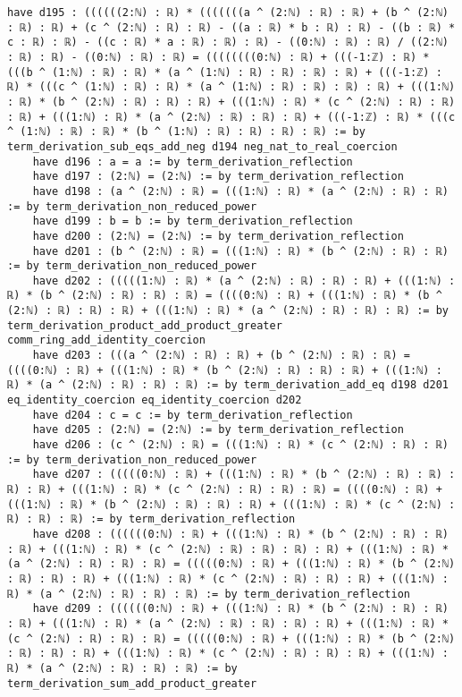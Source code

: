 \documentclass{article}
\begin{document}
\begin{tcolorbox}[colback=white!10, width=\linewidth]
\begin{lstlisting}[language=Lean4]
    have d195 : ((((((2:ℕ) : ℝ) * (((((((a ^ (2:ℕ) : ℝ) : ℝ) + (b ^ (2:ℕ) : ℝ) : ℝ) + (c ^ (2:ℕ) : ℝ) : ℝ) - ((a : ℝ) * b : ℝ) : ℝ) - ((b : ℝ) * c : ℝ) : ℝ) - ((c : ℝ) * a : ℝ) : ℝ) : ℝ) - ((0:ℕ) : ℝ) : ℝ) / ((2:ℕ) : ℝ) : ℝ) - ((0:ℕ) : ℝ) : ℝ) = ((((((((0:ℕ) : ℝ) + (((-1:ℤ) : ℝ) * (((b ^ (1:ℕ) : ℝ) : ℝ) * (a ^ (1:ℕ) : ℝ) : ℝ) : ℝ) : ℝ) + (((-1:ℤ) : ℝ) * (((c ^ (1:ℕ) : ℝ) : ℝ) * (a ^ (1:ℕ) : ℝ) : ℝ) : ℝ) : ℝ) + (((1:ℕ) : ℝ) * (b ^ (2:ℕ) : ℝ) : ℝ) : ℝ) + (((1:ℕ) : ℝ) * (c ^ (2:ℕ) : ℝ) : ℝ) : ℝ) + (((1:ℕ) : ℝ) * (a ^ (2:ℕ) : ℝ) : ℝ) : ℝ) + (((-1:ℤ) : ℝ) * (((c ^ (1:ℕ) : ℝ) : ℝ) * (b ^ (1:ℕ) : ℝ) : ℝ) : ℝ) : ℝ) := by term_derivation_sub_eqs_add_neg d194 neg_nat_to_real_coercion
    have d196 : a = a := by term_derivation_reflection
    have d197 : (2:ℕ) = (2:ℕ) := by term_derivation_reflection
    have d198 : (a ^ (2:ℕ) : ℝ) = (((1:ℕ) : ℝ) * (a ^ (2:ℕ) : ℝ) : ℝ) := by term_derivation_non_reduced_power
    have d199 : b = b := by term_derivation_reflection
    have d200 : (2:ℕ) = (2:ℕ) := by term_derivation_reflection
    have d201 : (b ^ (2:ℕ) : ℝ) = (((1:ℕ) : ℝ) * (b ^ (2:ℕ) : ℝ) : ℝ) := by term_derivation_non_reduced_power
    have d202 : (((((1:ℕ) : ℝ) * (a ^ (2:ℕ) : ℝ) : ℝ) : ℝ) + (((1:ℕ) : ℝ) * (b ^ (2:ℕ) : ℝ) : ℝ) : ℝ) = ((((0:ℕ) : ℝ) + (((1:ℕ) : ℝ) * (b ^ (2:ℕ) : ℝ) : ℝ) : ℝ) + (((1:ℕ) : ℝ) * (a ^ (2:ℕ) : ℝ) : ℝ) : ℝ) := by term_derivation_product_add_product_greater comm_ring_add_identity_coercion
    have d203 : (((a ^ (2:ℕ) : ℝ) : ℝ) + (b ^ (2:ℕ) : ℝ) : ℝ) = ((((0:ℕ) : ℝ) + (((1:ℕ) : ℝ) * (b ^ (2:ℕ) : ℝ) : ℝ) : ℝ) + (((1:ℕ) : ℝ) * (a ^ (2:ℕ) : ℝ) : ℝ) : ℝ) := by term_derivation_add_eq d198 d201 eq_identity_coercion eq_identity_coercion d202
    have d204 : c = c := by term_derivation_reflection
    have d205 : (2:ℕ) = (2:ℕ) := by term_derivation_reflection
    have d206 : (c ^ (2:ℕ) : ℝ) = (((1:ℕ) : ℝ) * (c ^ (2:ℕ) : ℝ) : ℝ) := by term_derivation_non_reduced_power
    have d207 : (((((0:ℕ) : ℝ) + (((1:ℕ) : ℝ) * (b ^ (2:ℕ) : ℝ) : ℝ) : ℝ) : ℝ) + (((1:ℕ) : ℝ) * (c ^ (2:ℕ) : ℝ) : ℝ) : ℝ) = ((((0:ℕ) : ℝ) + (((1:ℕ) : ℝ) * (b ^ (2:ℕ) : ℝ) : ℝ) : ℝ) + (((1:ℕ) : ℝ) * (c ^ (2:ℕ) : ℝ) : ℝ) : ℝ) := by term_derivation_reflection
    have d208 : ((((((0:ℕ) : ℝ) + (((1:ℕ) : ℝ) * (b ^ (2:ℕ) : ℝ) : ℝ) : ℝ) + (((1:ℕ) : ℝ) * (c ^ (2:ℕ) : ℝ) : ℝ) : ℝ) : ℝ) + (((1:ℕ) : ℝ) * (a ^ (2:ℕ) : ℝ) : ℝ) : ℝ) = (((((0:ℕ) : ℝ) + (((1:ℕ) : ℝ) * (b ^ (2:ℕ) : ℝ) : ℝ) : ℝ) + (((1:ℕ) : ℝ) * (c ^ (2:ℕ) : ℝ) : ℝ) : ℝ) + (((1:ℕ) : ℝ) * (a ^ (2:ℕ) : ℝ) : ℝ) : ℝ) := by term_derivation_reflection
    have d209 : ((((((0:ℕ) : ℝ) + (((1:ℕ) : ℝ) * (b ^ (2:ℕ) : ℝ) : ℝ) : ℝ) + (((1:ℕ) : ℝ) * (a ^ (2:ℕ) : ℝ) : ℝ) : ℝ) : ℝ) + (((1:ℕ) : ℝ) * (c ^ (2:ℕ) : ℝ) : ℝ) : ℝ) = (((((0:ℕ) : ℝ) + (((1:ℕ) : ℝ) * (b ^ (2:ℕ) : ℝ) : ℝ) : ℝ) + (((1:ℕ) : ℝ) * (c ^ (2:ℕ) : ℝ) : ℝ) : ℝ) + (((1:ℕ) : ℝ) * (a ^ (2:ℕ) : ℝ) : ℝ) : ℝ) := by term_derivation_sum_add_product_greater

\end{lstlisting}
\end{tcolorbox}
\end{document}
